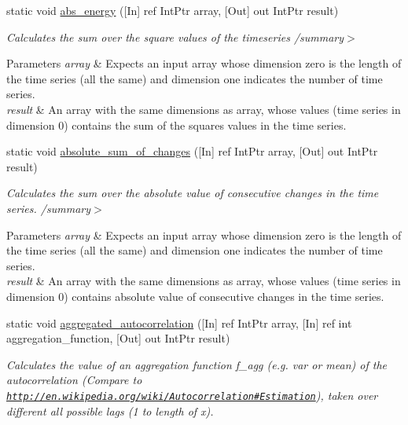 \begin{DoxyCompactItemize}
\item 
static void \mbox{\hyperlink{classkhiva_1_1interop_1_1_d_l_l_features_add3f5d3cd2b14953f9472087ae07ba2f}{abs\+\_\+energy}} (\mbox{[}In\mbox{]} ref Int\+Ptr array, \mbox{[}Out\mbox{]} out Int\+Ptr result)
\begin{DoxyCompactList}\small\item\em Calculates the sum over the square values of the timeseries /summary$>$ 
\begin{DoxyParams}{Parameters}
{\em array} & Expects an input array whose dimension zero is the length of the time series (all the same) and dimension one indicates the number of time series.\\
\hline
{\em result} & An array with the same dimensions as array, whose values (time series in dimension 0) contains the sum of the squares values in the time series.\\
\hline
\end{DoxyParams}
\end{DoxyCompactList}\item 
static void \mbox{\hyperlink{classkhiva_1_1interop_1_1_d_l_l_features_a95e6cc3d240709e4304a0a35477c14e6}{absolute\+\_\+sum\+\_\+of\+\_\+changes}} (\mbox{[}In\mbox{]} ref Int\+Ptr array, \mbox{[}Out\mbox{]} out Int\+Ptr result)
\begin{DoxyCompactList}\small\item\em Calculates the sum over the absolute value of consecutive changes in the time series. /summary$>$ 
\begin{DoxyParams}{Parameters}
{\em array} & Expects an input array whose dimension zero is the length of the time series (all the same) and dimension one indicates the number of time series.\\
\hline
{\em result} & An array with the same dimensions as array, whose values (time series in dimension 0) contains absolute value of consecutive changes in the time series.\\
\hline
\end{DoxyParams}
\end{DoxyCompactList}\item 
static void \mbox{\hyperlink{classkhiva_1_1interop_1_1_d_l_l_features_a288ecd6e1fcbf929f58eec74bf654164}{aggregated\+\_\+autocorrelation}} (\mbox{[}In\mbox{]} ref Int\+Ptr array, \mbox{[}In\mbox{]} ref int aggregation\+\_\+function, \mbox{[}Out\mbox{]} out Int\+Ptr result)
\begin{DoxyCompactList}\small\item\em Calculates the value of an aggregation function f\+\_\+agg (e.\+g. var or mean) of the autocorrelation (Compare to \href{http://en.wikipedia.org/wiki/Autocorrelation#Estimation}{\tt http\+://en.\+wikipedia.\+org/wiki/\+Autocorrelation\#\+Estimation}), taken over different all possible lags (1 to length of x). \end{DoxyCompactList}\item 

\end{DoxyCompactItemize}
